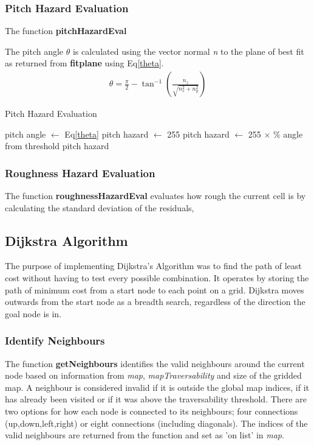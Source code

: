 \documentclass[Space3_Assign3.tex]{subfile}
\begin{document}
\subsubsection{Pitch Hazard Evaluation}
The function \textbf{pitchHazardEval}

The pitch angle $\theta$ is calculated using the vector normal \textit{n} to the plane of best fit as returned from \textbf{fitplane} using Eq\eqref{theta}.
\begin{eqnarray}
\theta = \frac{\pi}{2} - \tan^{-1}\left( \frac{n_z}{\sqrt{n_x^2+n_y^2}} \right) \label{theta}
\end{eqnarray}

\begin{algorithm}
\caption{Pitch Hazard Evaluation} \label{PC:pitch}
\begin{algorithmic}
\State pitch angle $\gets$ Eq\eqref{theta}
\State pitch hazard $\gets$ 255
\Else
\State pitch hazard $\gets$ 255 $\times$ \% angle from threshold
\EndIf
\Return pitch hazard
\end{algorithmic}
\end{algorithm}

\subsubsection{Roughness Hazard Evaluation}
The function \textbf{roughnessHazardEval} evaluates how rough the current cell is by calculating the standard deviation of the residuals,


\subsection{Dijkstra Algorithm}
The purpose of implementing Dijkstra's Algorithm was to find the path of least cost without having to test every possible combination. It operates by storing the path of minimum cost from a start node to each point on a grid. Dijkstra moves outwards from the start node as a breadth search, regardless of the direction the goal node is in. 



\subsubsection{Identify Neighbours}
The function \textbf{getNeighbours} identifies the valid neighbours around the current node based on information from \textit{map}, \textit{mapTraversability} and size of the gridded map. A neighbour is considered invalid if it is outside the global map indices, if it has already been visited or if it was above the traversability threshold. There are two options for how each node is connected to its neighbours; four connections (up,down,left,right) or eight connections (including diagonals). The indices of the valid neighbours are returned from the function and set as 'on list' in \textit{map}.
\end{document}
